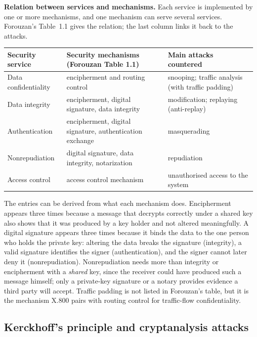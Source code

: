 \textbf{Relation between services and mechanisms.} Each service is implemented by one or more mechanisms, and one mechanism can serve several services. Forouzan's Table~1.1 gives the relation; the last column links it back to the attacks.
\begin{center}\small
\begin{tabularx}{\textwidth}{@{}l X X@{}}
\toprule
Security service & Security mechanisms (Forouzan Table 1.1) & Main attacks countered\\
\midrule
Data confidentiality & encipherment and routing control & snooping; traffic analysis (with traffic padding)\\
Data integrity & encipherment, digital signature, data integrity & modification; replaying (anti-replay)\\
Authentication & encipherment, digital signature, authentication exchange & masquerading\\
Nonrepudiation & digital signature, data integrity, notarization & repudiation\\
Access control & access control mechanism & unauthorised access to the system\\
\bottomrule
\end{tabularx}
\end{center}
The entries can be derived from what each mechanism does. Encipherment appears three times because a message that decrypts correctly under a shared key also shows that it was produced by a key holder and not altered meaningfully. A digital signature appears three times because it binds the data to the one person who holds the private key: altering the data breaks the signature (integrity), a valid signature identifies the signer (authentication), and the signer cannot later deny it (nonrepudiation). Nonrepudiation needs more than integrity or encipherment with a \emph{shared} key, since the receiver could have produced such a message himself; only a private-key signature or a notary provides evidence a third party will accept. Traffic padding is not listed in Forouzan's table, but it is the mechanism X.800 pairs with routing control for traffic-flow confidentiality.

\subsection{Kerckhoff's principle and cryptanalysis attacks \hot}

